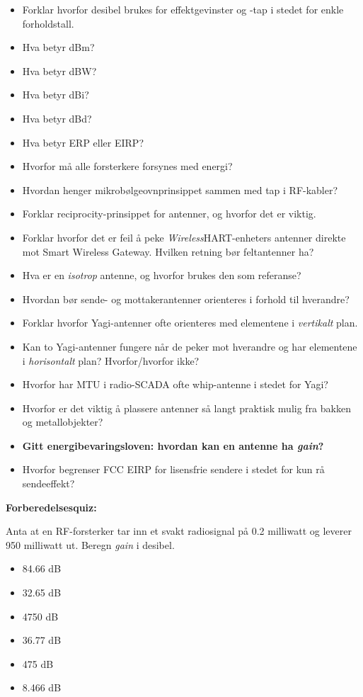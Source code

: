\begin{itemize}
\item{} Forklar hvorfor desibel brukes for effektgevinster og -tap i stedet for enkle forholdstall.
\item{} Hva betyr dBm?
\item{} Hva betyr dBW?
\item{} Hva betyr dBi?
\item{} Hva betyr dBd?
\item{} Hva betyr ERP eller EIRP?
\item{} Hvorfor må alle forsterkere forsynes med energi?
\item{} Hvordan henger mikrobølgeovnprinsippet sammen med tap i RF-kabler?
\item{} Forklar reciprocity-prinsippet for antenner, og hvorfor det er viktig.
\item{} Forklar hvorfor det er feil å peke {\sl Wireless}HART-enheters antenner direkte mot Smart Wireless Gateway. Hvilken retning bør feltantenner ha?
\item{} Hva er en {\it isotrop} antenne, og hvorfor brukes den som referanse?
\item{} Hvordan bør sende- og mottakerantenner orienteres i forhold til hverandre?
\item{} Forklar hvorfor Yagi-antenner ofte orienteres med elementene i {\it vertikalt} plan.
\item{} Kan to Yagi-antenner fungere når de peker mot hverandre og har elementene i {\it horisontalt} plan? Hvorfor/hvorfor ikke?
\item{} Hvorfor har MTU i radio-SCADA ofte whip-antenne i stedet for Yagi?
\item{} Hvorfor er det viktig å plassere antenner så langt praktisk mulig fra bakken og metallobjekter?
\item{} {\bf Gitt energibevaringsloven: hvordan kan en antenne ha {\it gain}?}
\item{} Hvorfor begrenser FCC EIRP for lisensfrie sendere i stedet for kun rå sendeeffekt?
\end{itemize}

\vfil \eject

\noindent
{\bf Forberedelsesquiz:}

Anta at en RF-forsterker tar inn et svakt radiosignal på 0.2 milliwatt og leverer 950 milliwatt ut. Beregn {\it gain} i desibel.

\begin{itemize}
\item{} 84.66 dB
\vskip 5pt 
\item{} 32.65 dB
\vskip 5pt 
\item{} 4750 dB
\vskip 5pt 
\item{} 36.77 dB
\vskip 5pt 
\item{} 475 dB
\vskip 5pt 
\item{} 8.466 dB
\end{itemize}



